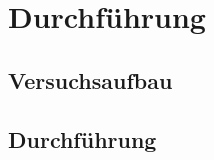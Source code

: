 \section{Durchführung}
\label{sec:Durchführung}
\subsection{Versuchsaufbau}
\subsection{Durchführung}
